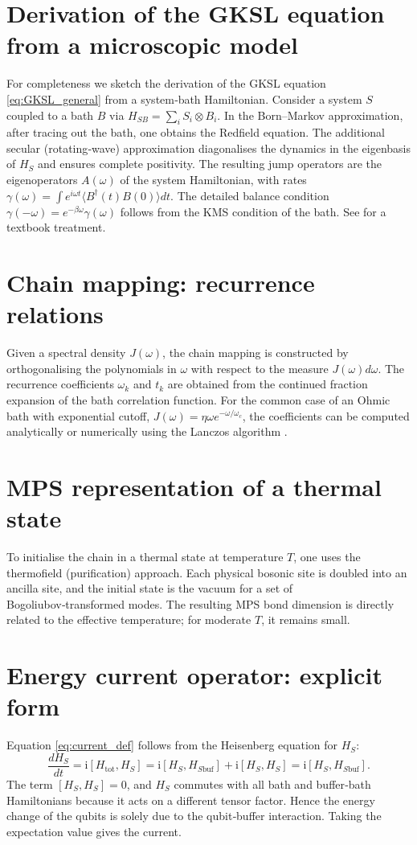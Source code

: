 \documentclass[11pt,a4paper]{article}
\theoremstyle{plain}
\theoremstyle{definition}
\theoremstyle{remark}
\newcommand{\ii}{\mathrm{i}}
\begin{document}
\begin{appendices}
\section{Derivation of the GKSL equation from a microscopic model}
For completeness we sketch the derivation of the GKSL equation \eqref{eq:GKSL_general} from a system‑bath Hamiltonian. Consider a system $S$ coupled to a bath $B$ via $H_{SB}= \sum_i S_i\otimes B_i$. In the Born–Markov approximation, after tracing out the bath, one obtains the Redfield equation. The additional secular (rotating‑wave) approximation diagonalises the dynamics in the eigenbasis of $H_S$ and ensures complete positivity. The resulting jump operators are the eigenoperators $A(\omega)$ of the system Hamiltonian, with rates $\gamma(\omega)= \int e^{i\omega t}\langle B^\dagger(t)B(0)\rangle dt$. The detailed balance condition $\gamma(-\omega)=e^{-\beta\omega}\gamma(\omega)$ follows from the KMS condition of the bath. See \cite{Breuer2002} for a textbook treatment.

\section{Chain mapping: recurrence relations}
Given a spectral density $J(\omega)$, the chain mapping is constructed by orthogonalising the polynomials in $\omega$ with respect to the measure $J(\omega)d\omega$. The recurrence coefficients $\omega_k$ and $t_k$ are obtained from the continued fraction expansion of the bath correlation function. For the common case of an Ohmic bath with exponential cutoff, $J(\omega)= \eta\omega e^{-\omega/\omega_c}$, the coefficients can be computed analytically or numerically using the Lanczos algorithm \cite{Chin2010}.

\section{MPS representation of a thermal state}
To initialise the chain in a thermal state at temperature $T$, one uses the thermofield (purification) approach. Each physical bosonic site is doubled into an ancilla site, and the initial state is the vacuum for a set of Bogoliubov‑transformed modes. The resulting MPS bond dimension is directly related to the effective temperature; for moderate $T$, it remains small.

\section{Energy current operator: explicit form}
Equation \eqref{eq:current_def} follows from the Heisenberg equation for $H_S$:
\begin{equation}
\frac{d H_S}{dt} = \ii[ H_{\text{tot}}, H_S ] = \ii[ H_S, H_{S\text{buf}} ] + \ii[ H_S, H_S ] = \ii[ H_S, H_{S\text{buf}} ].
\end{equation}
The term $[H_S, H_S]=0$, and $H_S$ commutes with all bath and buffer‑bath Hamiltonians because it acts on a different tensor factor. Hence the energy change of the qubits is solely due to the qubit‑buffer interaction. Taking the expectation value gives the current.
\end{appendices}
\end{document}
